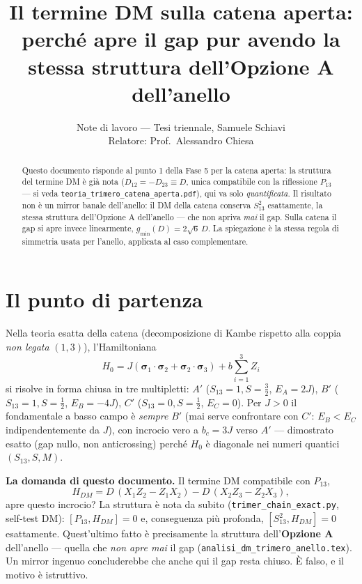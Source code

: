 \documentclass[11pt,a4paper]{article}
\title{\bfseries Il termine DM sulla catena aperta:\\
perché apre il gap pur avendo la stessa struttura dell'Opzione A dell'anello}
\author{Note di lavoro — Tesi triennale, Samuele Schiavi\\ \small Relatore: Prof.\ Alessandro Chiesa}
\date{}
\begin{document}
\maketitle
\thispagestyle{fancy}

\begin{abstract}
\noindent
Questo documento risponde al punto 1 della Fase 5 per la catena aperta: la struttura
del termine DM è già nota ($D_{12}=-D_{23}\equiv D$, unica compatibile con la
riflessione $P_{13}$ — si veda \texttt{teoria\_trimero\_catena\_aperta.pdf}), qui va
solo \emph{quantificata}. Il risultato non è un mirror banale dell'anello: il DM della
catena conserva $S_{13}^2$ esattamente, la stessa struttura dell'Opzione A
dell'anello — che non apriva \emph{mai} il gap. Sulla catena il gap si apre invece
linearmente, $g_\text{min}(D)=2\sqrt6\,D$. La spiegazione è la stessa regola di
simmetria usata per l'anello, applicata al caso complementare.
\end{abstract}

\section{Il punto di partenza}

Nella teoria esatta della catena (decomposizione di Kambe rispetto alla coppia
\emph{non legata} $(1,3)$), l'Hamiltoniana
\[
H_0 = J(\boldsymbol\sigma_1\!\cdot\!\boldsymbol\sigma_2+\boldsymbol\sigma_2\!\cdot\!\boldsymbol\sigma_3)
+ b\sum_{i=1}^3 Z_i
\]
si risolve in forma chiusa in tre multipletti: $A'$ ($S_{13}{=}1,S{=}\tfrac32$, $E_A=2J$),
$B'$ ($S_{13}{=}1,S{=}\tfrac12$, $E_B=-4J$), $C'$ ($S_{13}{=}0,S{=}\tfrac12$, $E_C=0$).
Per $J>0$ il fondamentale a basso campo è \emph{sempre} $B'$ (mai serve confrontare
con $C'$: $E_B<E_C$ indipendentemente da $J$), con incrocio vero a $b_c=3J$ verso
$A'$ — dimostrato esatto (gap nullo, non anticrossing) perché $H_0$ è diagonale nei
numeri quantici $(S_{13},S,M)$.

\textbf{La domanda di questo documento.} Il termine DM compatibile con $P_{13}$,
\[
H_{DM} = D\,(X_1Z_2-Z_1X_2) - D\,(X_2Z_3-Z_2X_3),
\]
apre questo incrocio? La struttura è nota da subito (\texttt{trimer\_chain\_exact.py},
self-test DM): $[P_{13},H_{DM}]=0$ e, conseguenza più profonda,
$[S_{13}^2,H_{DM}]=0$ esattamente. Quest'ultimo fatto è precisamente la struttura
dell'\textbf{Opzione A} dell'anello — quella che \emph{non apre mai} il gap
(\texttt{analisi\_dm\_trimero\_anello.tex}). Un mirror ingenuo concluderebbe che
anche qui il gap resta chiuso. È falso, e il motivo è istruttivo.
\end{document}
